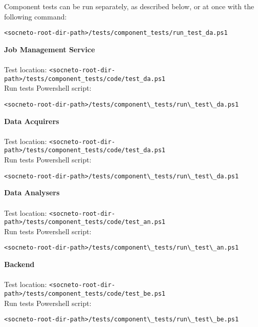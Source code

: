 Component tests can be run separately, as described below, or at once with the following command: \\ \begin{lstlisting}[style=DOS]
<socneto-root-dir-path>/tests/component_tests/run_test_da.ps1
\end{lstlisting}
\vspace{\baselineskip}
\textbf{Job Management Service} \\ \\
Test location: \texttt{<socneto-root-dir-path>/tests/component\_tests/code/test\_da.ps1} \\
Run tests Powershell script:\\ \begin{lstlisting}[style=DOS]
<socneto-root-dir-path>/tests/component\_tests/run\_test\_da.ps1
\end{lstlisting}
\vspace{\baselineskip}
\textbf{Data Acquirers}
\\ \\
Test location: \texttt{<socneto-root-dir-path>/tests/component\_tests/code/test\_da.ps1}\\
Run tests Powershell script:\\ \begin{lstlisting}[style=DOS]
<socneto-root-dir-path>/tests/component\_tests/run\_test\_da.ps1
\end{lstlisting}
\vspace{\baselineskip}
\textbf{Data Analysers}
\\ \\
Test location: \texttt{<socneto-root-dir-path>/tests/component\_tests/code/test\_an.ps1}\\
Run tests Powershell script:\\ \begin{lstlisting}[style=DOS]
<socneto-root-dir-path>/tests/component\_tests/run\_test\_an.ps1
\end{lstlisting}
\vspace{\baselineskip}
\textbf{Backend}
\\ \\
Test location: \texttt{<socneto-root-dir-path>/tests/component\_tests/code/test\_be.ps1}\\
Run tests Powershell script:\\ \begin{lstlisting}[style=DOS]
<socneto-root-dir-path>/tests/component\_tests/run\_test\_be.ps1
\end{lstlisting}
